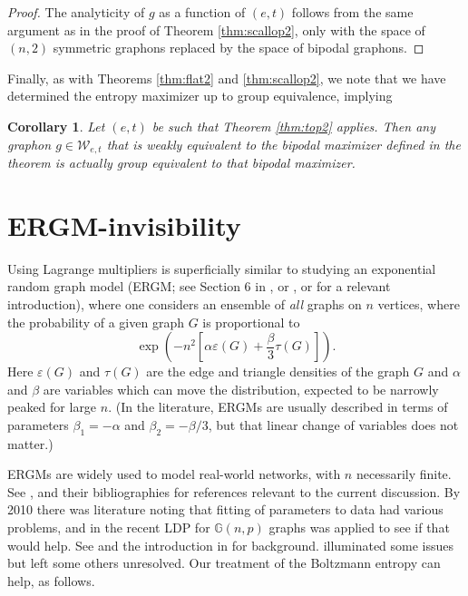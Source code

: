 \documentclass[12pt]{amsart}
\newtheorem{corollary}[lemma]{Corollary}
\newcommand\be{\begin{equation}}
\newcommand\ee{\end{equation}}
\newcommand{\tdens}{\tau}
\newcommand{\edens}{\varepsilon}
\newcommand{\G}{\mathbb{G}}
\newcommand{\regular}{\mathcal{W}}
\begin{document}
{\begin{proof}
The analyticity of $g$ as a function of $(e,t)$ follows from the 
same argument as in the proof of Theorem \ref{thm:scallop2}, only with
the space of $(n,2)$ symmetric graphons replaced by the space of
bipodal graphons. 

\end{proof}

Finally, as with Theorems \ref{thm:flat2} and \ref{thm:scallop2}, we note that
we have determined the entropy maximizer up to group equivalence, implying 

\begin{corollary} \label{cor:top2} Let $(e,t)$ be such that Theorem 
\ref{thm:top2} applies. Then any graphon $g \in \regular_{e,t}$ that is weakly
equivalent to the bipodal maximizer defined in the theorem is actually group
equivalent to that bipodal maximizer. 
\end{corollary}

\section{ERGM-invisibility}\label{sec:No-ERGM} 

Using Lagrange multipliers is superficially similar to studying an 
exponential random graph model (ERGM; see Section 6 in \cite{Ch16}, or \cite{DL}, or \cite{CD} for a relevant introduction),
where one considers an ensemble of {\em all} graphs on $n$ vertices, where the probability of a given graph $G$
is proportional to 
\be \exp \left (-n^2 \left [ \alpha \edens(G) + \frac{\beta}{3} \tdens(G) \right ] \right ). \ee
Here $\edens(G)$ and $\tdens(G)$ are the edge and triangle densities of the graph $G$ and $\alpha$ and $\beta$ are variables which can move the distribution, expected to be narrowly peaked for large $n$. 
(In the literature, ERGMs are usually described in terms of parameters
$\beta_1=-\alpha$ and $\beta_2=-\beta/3$, but that linear change of variables does not matter.)

ERGMs are widely used to model real-world networks, with $n$ necessarily finite. See \cite{F1}, \cite{F2} and their bibliographies for references relevant to the current discussion.
By 2010 there was literature noting that fitting of parameters to data had various problems, and in \cite{CD} the recent LDP for $\G(n,p)$ graphs \cite{CV} was applied to see if that would help. See \cite{Bhamidi} and the introduction in \cite{CD} for background.
\cite{CD} illuminated some issues but left some others unresolved. Our treatment of the Boltzmann entropy can help, as follows.

}
\end{document}
